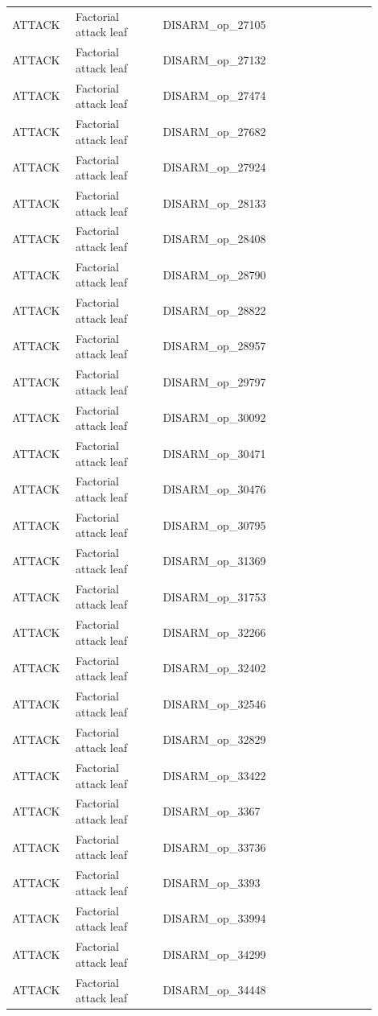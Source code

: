 \begin{table}[htbp]
\begin{threeparttable}
\begin{tabular}{p{0.14\linewidth}p{0.22\linewidth}p{0.54\linewidth}}
ATTACK & Factorial attack leaf & DISARM\_op\_27105 \\
ATTACK & Factorial attack leaf & DISARM\_op\_27132 \\
ATTACK & Factorial attack leaf & DISARM\_op\_27474 \\
ATTACK & Factorial attack leaf & DISARM\_op\_27682 \\
ATTACK & Factorial attack leaf & DISARM\_op\_27924 \\
ATTACK & Factorial attack leaf & DISARM\_op\_28133 \\
ATTACK & Factorial attack leaf & DISARM\_op\_28408 \\
ATTACK & Factorial attack leaf & DISARM\_op\_28790 \\
ATTACK & Factorial attack leaf & DISARM\_op\_28822 \\
ATTACK & Factorial attack leaf & DISARM\_op\_28957 \\
ATTACK & Factorial attack leaf & DISARM\_op\_29797 \\
ATTACK & Factorial attack leaf & DISARM\_op\_30092 \\
ATTACK & Factorial attack leaf & DISARM\_op\_30471 \\
ATTACK & Factorial attack leaf & DISARM\_op\_30476 \\
ATTACK & Factorial attack leaf & DISARM\_op\_30795 \\
ATTACK & Factorial attack leaf & DISARM\_op\_31369 \\
ATTACK & Factorial attack leaf & DISARM\_op\_31753 \\
ATTACK & Factorial attack leaf & DISARM\_op\_32266 \\
ATTACK & Factorial attack leaf & DISARM\_op\_32402 \\
ATTACK & Factorial attack leaf & DISARM\_op\_32546 \\
ATTACK & Factorial attack leaf & DISARM\_op\_32829 \\
ATTACK & Factorial attack leaf & DISARM\_op\_33422 \\
ATTACK & Factorial attack leaf & DISARM\_op\_3367 \\
ATTACK & Factorial attack leaf & DISARM\_op\_33736 \\
ATTACK & Factorial attack leaf & DISARM\_op\_3393 \\
ATTACK & Factorial attack leaf & DISARM\_op\_33994 \\
ATTACK & Factorial attack leaf & DISARM\_op\_34299 \\
ATTACK & Factorial attack leaf & DISARM\_op\_34448 \\

\end{tabular}
\end{threeparttable}
\end{table}
